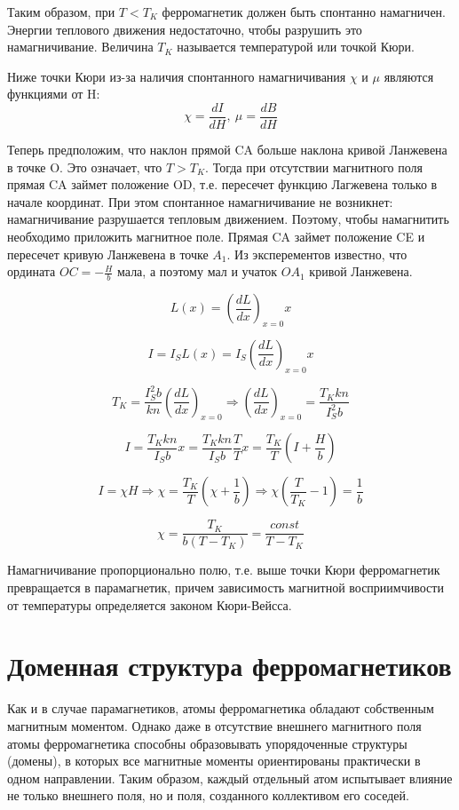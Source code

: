 \documentclass[a4paper,14pt]{article} %
\begin{document}
Таким образом, при $T < T_K$ ферромагнетик должен быть спонтанно намагничен. Энергии теплового движения недостаточно, чтобы разрушить это намагничивание. Величина $T_K$ называется температурой или точкой Кюри.

Ниже точки Кюри из-за наличия спонтанного намагничивания $\chi$ и $\mu$ являются функциями от H:
\[\chi = \frac{dI}{dH},~ \mu = \frac{dB}{dH}\]

Теперь предположим, что наклон прямой CA больше наклона кривой Ланжевена в точке O. Это означает, что $T > T_K$. Тогда при отсутствии магнитного поля прямая CA займет положение OD, т.е. пересечет функцию Лагжевена только в начале координат. При этом спонтанное намагничивание не возникнет: намагничивание разрушается тепловым движением. Поэтому, чтобы намагнитить необходимо приложить магнитное поле. Прямая CA займет положение CE и пересечет кривую Ланжевена в точке $A_1$. Из эксперементов известно, что ордината $OC = -\frac{H}{b}$ мала, а поэтому мал и учаток $OA_1$ кривой Ланжевена.

\[L(x) = \left(\frac{dL}{dx}\right)_{x=0}x\]

\[I = I_S L(x) = I_S \left(\frac{dL}{dx}\right)_{x=0}x\]

\[T_K = \frac{I_S^2 b}{kn}\left(\frac{dL}{dx}\right)_{x=0} \Rightarrow \left(\frac{dL}{dx}\right)_{x=0} = \frac{T_K k n}{I_S^2b}\]

\[I = \frac{T_K k n}{I_Sb} x = \frac{T_K k n}{I_Sb} \frac{T}{T}x = \frac{T_K}{T}\left(I + \frac{H}{b}\right)\]

\[I = \chi H \Rightarrow \chi = \frac{T_K}{T}\left(\chi + \frac{1}{b}\right) \Rightarrow \chi\left(\frac{T}{T_K} - 1\right) = \frac{1}{b}\]

\[\chi = \frac{T_K}{b(T - T_K)} = \frac{const}{T-T_K}\]

Намагничивание пропорционально полю, т.е. выше точки Кюри ферромагнетик превращается в парамагнетик, причем зависимость магнитной восприимчивости от температуры определяется законом Кюри-Вейсса.


\section{Доменная структура ферромагнетиков}

Как и в случае парамагнетиков, атомы ферромагнетика обладают собственным магнитным моментом. Однако даже в отсутствие внешнего магнитного поля атомы ферромагнетика способны образовывать упорядоченные структуры (домены), в которых все магнитные моменты ориентированы практически в одном направлении. Таким образом, каждый отдельный атом испытывает влияние не только внешнего поля, но и поля, созданного коллективом его соседей.
\end{document}
